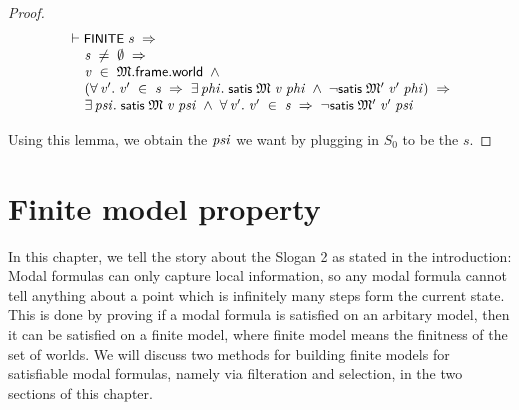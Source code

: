 \documentclass[letterpaper]{article}
\renewcommand{\HOLConst}[1]{{\textsf{\upshape\small #1}}}
\renewcommand{\HOLinline}[1]{\ensuremath{#1}}
\newenvironment{holmath}{\begin{displaymath}\begin{array}{l}}{\end{array}\end{displaymath}\ignorespacesafterend}
\begin{document}
\begin{proof}
\begin{holmath}
  \ensuremath{\HOLTokenTurnstile}\HOLConst{FINITE}\;\HOLFreeVar{s}\;\HOLSymConst{\HOLTokenImp{}}\\
\;\;\;\;\;\HOLFreeVar{s}\;\HOLSymConst{\HOLTokenNotEqual{}}\;\HOLSymConst{\HOLTokenEmpty{}}\;\HOLSymConst{\HOLTokenImp{}}\\
\;\;\;\;\;\HOLFreeVar{v}\;\HOLSymConst{\HOLTokenIn{}}\;\HOLFreeVar{\ensuremath{\mathfrak{M}}}.\HOLFieldName{frame}.\HOLFieldName{world}\;\HOLSymConst{\HOLTokenConj{}}\\
\;\;\;\;\;(\HOLSymConst{\HOLTokenForall{}}\HOLBoundVar{v\sp{\prime}}.\;\HOLBoundVar{v\sp{\prime}}\;\HOLSymConst{\HOLTokenIn{}}\;\HOLFreeVar{s}\;\HOLSymConst{\HOLTokenImp{}}\;\HOLSymConst{\HOLTokenExists{}}\HOLBoundVar{phi}.\;\HOLConst{satis}\;\HOLFreeVar{\ensuremath{\mathfrak{M}}}\;\HOLFreeVar{v}\;\HOLBoundVar{phi}\;\HOLSymConst{\HOLTokenConj{}}\;\HOLSymConst{\HOLTokenNeg{}}\HOLConst{satis}\;\HOLFreeVar{\ensuremath{\mathfrak{M}'}}\;\HOLBoundVar{v\sp{\prime}}\;\HOLBoundVar{phi})\;\HOLSymConst{\HOLTokenImp{}}\\
\;\;\;\;\;\HOLSymConst{\HOLTokenExists{}}\HOLBoundVar{psi}.\;\HOLConst{satis}\;\HOLFreeVar{\ensuremath{\mathfrak{M}}}\;\HOLFreeVar{v}\;\HOLBoundVar{psi}\;\HOLSymConst{\HOLTokenConj{}}\;\HOLSymConst{\HOLTokenForall{}}\HOLBoundVar{v\sp{\prime}}.\;\HOLBoundVar{v\sp{\prime}}\;\HOLSymConst{\HOLTokenIn{}}\;\HOLFreeVar{s}\;\HOLSymConst{\HOLTokenImp{}}\;\HOLSymConst{\HOLTokenNeg{}}\HOLConst{satis}\;\HOLFreeVar{\ensuremath{\mathfrak{M}'}}\;\HOLBoundVar{v\sp{\prime}}\;\HOLBoundVar{psi}
\end{holmath}
 
Using this lemma, we obtain the \HOLinline{\HOLFreeVar{psi}} we want by plugging in $S_0$ to be the $s$. 
\end{proof}

\section{Finite model property}

In this chapter, we tell the story about the Slogan 2 as stated in the introduction: Modal formulas can only capture local information, so any modal formula cannot tell anything about a point which is infinitely many steps form the current state. This is done by proving if a modal formula is satisfied on an arbitary model, then it can be satisfied on a finite model, where finite model means the finitness of the set of worlds. We will discuss two methods for building finite models for satisfiable modal formulas, namely via filteration and selection, in the two sections of this chapter. 
\end{document}
